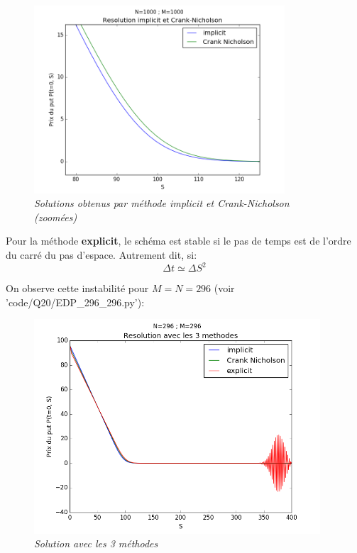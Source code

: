 \documentclass[10pt]{article}
\begin{document}
  \begin{figure}[H]
    \begin{center}
      \includegraphics[height=7cm,keepaspectratio]{images/implicit_crank-nicholson_1000_1000_zoom.png}
    \end{center}
    \caption{\textit{Solutions obtenus par méthode implicit et Crank-Nicholson (zoomées)}}
    \label{implicit_1000_1000}
  \end{figure}
  
  
  \newpage
  Pour la méthode \textbf{explicit}, le schéma est stable si le pas de temps est de l'ordre du carré du pas d'espace.
  Autrement dit, si: $$\Delta t \simeq \Delta S^2$$
  
  On observe cette instabilité pour $M = N = 296$ (voir 'code/Q20/EDP\_296\_296.py'):
  
  \begin{figure}[H]
    \begin{center}
      \includegraphics[height=8cm,keepaspectratio]{./images/explicit_implicit_cranknicholson_296_296.png}
    \end{center}
    \caption{\textit{Solution avec les 3 méthodes}}
    \label{explicit_implicit_cranknicholson_296_296}
  \end{figure}
  
\end{document}
